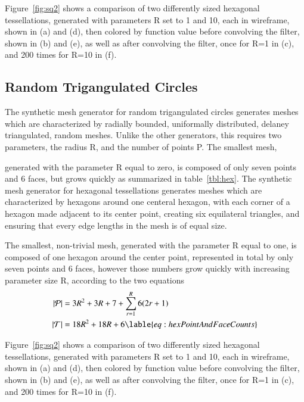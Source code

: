 Figure~\ref{fig:sq2} shows a comparison of two differently sized hexagonal tessellations, generated with parameters R set to 1 and 10, each in wireframe, shown in (a) and (d), then colored by function value before convolving the filter, shown in (b) and (e), as well as after convolving the filter, once for R=1 in (c), and 200 times for R=10 in (f).



%
%
%
%
\pagebreak
\subsection{Random Trigangulated Circles}
The synthetic mesh generator for random trigangulated circles generates meshes which are characterized by radially bounded, uniformally distributed, delaney triangulated, random meshes. Unlike the other generators, this requires two parameters, the radius R, and the number of points P. The smallest mesh,



generated with the parameter R equal to zero, is composed of only seven points and 6 faces, but grows quickly as summarized in table~\ref{tbl:hex}.
The synthetic mesh generator for hexagonal tessellations generates meshes which are characterized by hexagons around one centeral hexagon, with each corner of a hexagon made adjacent to its center point, creating six equilateral triangles, and ensuring that every edge lengths in the mesh is of equal size.

The smallest, non-trivial mesh, generated with the parameter R equal to one, is composed of one hexagon around the center point, represented in total by only seven points and 6 faces, however those numbers grow quickly with increasing parameter size R, according to the two equations
\begin{align}
	|\bP| &= 3R^2 + 3R + 7 +\sum_{r=1}^R{6(2r + 1)}\\
	|\bT| &= 18R^2 + 18R + 6
	\lable{eq:hexPointAndFaceCounts}
\end{align}

Figure~\ref{fig:sq2} shows a comparison of two differently sized hexagonal tessellations, generated with parameters R set to 1 and 10, each in wireframe, shown in (a) and (d), then colored by function value before convolving the filter, shown in (b) and (e), as well as after convolving the filter, once for R=1 in (c), and 200 times for R=10 in (f).



